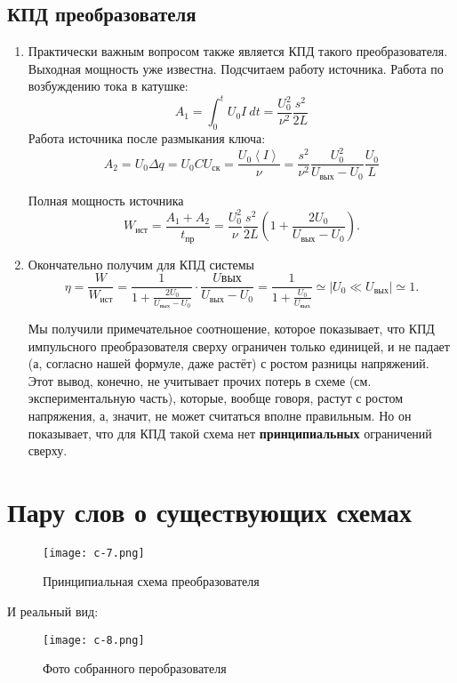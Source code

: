 \documentclass{letask}
\begin{document}
\subsection*{КПД преобразователя}
\begin{enumerate}[resume]
\item Практически важным вопросом также является КПД такого преобразователя. Выходная мощность уже известна. Подсчитаем работу источника.
Работа по возбуждению тока в катушке:
$$A_1 = \int_0^t U_0 I ~ dt = \frac{U_0^2}{\nu^2} \frac{s^2}{2L}$$
Работа источника после размыкания ключа:
$$A_2 = U_0 \Delta q = U_0 C U_\text{ск} = \frac{U_0 \left< I \right>}{\nu} = \frac{s^2}{\nu^2} \frac{U_0^2}{U_\text{вых}-U_0} \frac{U_0}{L}$$

Полная мощность источника
$$W_\text{ист} = \frac{A_1+A_2}{t_\text{пр}} = \frac{U_0^2}{\nu} \frac{s^2}{2L} \left( 1+ \frac{2U_0}{U_\text{вых} - U_0} \right).$$
\item Окончательно получим для КПД системы
$$\eta = \frac{W}{W_\text{ист}} = \frac{1}{1+\tfrac{2U_0}{U_\text{вых}-U_0}} \cdot \frac{U\text{вых}}{U_\text{вых}-U_0} = \frac{1}{1+\tfrac{U_0}{U_\text{вых}}} \simeq \Big| U_0 \ll U_\text{вых} \Big| \simeq 1.$$

Мы получили примечательное соотношение, которое показывает, что КПД импульсного преобразователя сверху ограничен только единицей, и не падает (а, согласно нашей формуле, даже растёт) с ростом разницы напряжений. Этот вывод, конечно, не учитывает прочих потерь в схеме (см. экспериментальную часть), которые, вообще говоря, растут с ростом напряжения, а, значит, не может считаться вполне правильным. Но он показывает, что для КПД такой схема нет \textbf{принципиальных} ограничений сверху.
\end{enumerate}


\section*{Пару слов о существующих схемах}

\begin{figure}[H]
\centering
\texttt{[image: c-7.png]}
\caption{Принципиальная схема преобразователя}
\end{figure}

И реальный вид:\\

\begin{figure}[H]
\centering   
\texttt{[image: c-8.png]}
\caption{Фото собранного перобразователя}
\end{figure}
\end{document}
